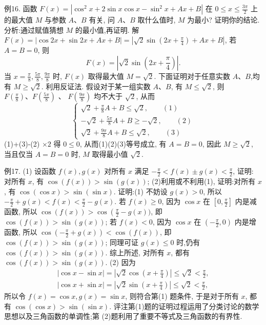例16. 函数 $F(x)=\left|\cos ^2 x+2 \sin x \cos x-\sin ^2 x+A x+B\right|$ 在 $0 \leqslant x \leqslant \frac{3 \pi}{2}$ 上的最大值 $M$ 与参数 $A 、 B$ 有关, 问 $A 、 B$ 取什么值时, $M$ 为最小? 证明你的结论.
分析:通过赋值猜想 $M$ 的最小值,再证明.
解 $F(x)=|\cos 2 x+\sin 2 x+A x+B|=\left|\sqrt{2} \sin \left(2 x+\frac{\pi}{4}\right)+A x+B\right|$, 若 $A=B=0$, 则
$$
F(x)=\left|\sqrt{2} \sin \left(2 x+\frac{\pi}{4}\right)\right| .
$$
当 $x=\frac{\pi}{8}, \frac{5 \pi}{8}, \frac{9 \pi}{8}$ 时, $F(x)$ 取得最大值 $M=\sqrt{2}$.
下面证明对于任意实数 $A 、 B$,均有 $M \geqslant \sqrt{2}$.
利用反证法.
假设对于某一组实数 $A 、 B$, 有 $M \leqslant \sqrt{2}$, 则 $F\left(\frac{\pi}{8}\right) 、 F\left(\frac{5 \pi}{8}\right)$ 、
$F\left(\frac{9 \pi}{8}\right)$ 均不大于 $\sqrt{2}$, 从而
$$
\left\{\begin{array}{l}
\sqrt{2}+\frac{\pi}{8} A+B \leqslant \sqrt{2}, \quad\quad(1)\\
-\sqrt{2}+\frac{5 \pi}{8} A+B \geqslant-\sqrt{2}, \quad\quad(2)\\
\sqrt{2}+\frac{9 \pi}{8} A+B \leqslant \sqrt{2}, \quad\quad(3)
\end{array}\right.
$$
(1)+(3)-(2) $\times 2$ 得 $0 \leqslant 0$, 从而(1)(2)(3)等号成立, 有 $A=B=0$, 因此 $M \geqslant \sqrt{2}$, 当且仅当 $A=B=0$ 时, $M$ 取得最小值 $\sqrt{2}$.



例17. (1) 设函数 $f(x), g(x)$ 对所有 $x$ 满足 $-\frac{\pi}{2}<f(x) \pm g(x)<\frac{\pi}{2}$, 证明: 对所有 $x$, 有 $\cos (f(x))>\sin (g(x))$;
 (2)利用或不利用(1), 证明:对所有 $x$, 有 $\cos (\cos x)>\sin (\sin x)$.
证明:(1) 不妨设 $g(x)>0$, 所以 $-\frac{\pi}{2}+g(x)<f(x)<\frac{\pi}{2}-g(x)$.
若 $f(x) \geqslant 0$, 因为 $\cos x$ 在 $\left[0, \frac{\pi}{2}\right]$ 内是减函数, 所以 $\cos (f(x))>\cos \left(\frac{\pi}{2}-\right. g(x))$, 即 $\cos (f(x))>\sin (g(x))$;
若 $f(x)<0$, 因为 $\cos x$ 在 $\left(-\frac{\pi}{2}, 0\right)$ 内是增函数, 所以 $\cos \left(-\frac{\pi}{2}+g(x)\right)< \cos (f(x))$, 即 $\cos (f(x))>\sin (g(x))$;
同理可证 $g(x) \leqslant 0$ 时,仍有 $\cos (f(x))>\sin (g(x))$.
综上所述, 对所有 $x$, 都有 $\cos (f(x))>\sin (g(x))$.
(2) 因为
$$
\begin{gathered}
|\cos x-\sin x|=\left|\sqrt{2} \cos \left(x+\frac{\pi}{4}\right)\right| \leqslant \sqrt{2}<\frac{\pi}{2}, \\
|\cos x+\sin x|=\left|\sqrt{2} \sin \left(x+\frac{\pi}{4}\right)\right| \leqslant \sqrt{2}<\frac{\pi}{2},
\end{gathered}
$$
所以令 $f(x)=\cos x, g(x)=\sin x$, 则符合第(1) 题条件, 于是对于所有 $x$, 都有 $\cos (\cos x)>\sin (\sin x)$.
评注第(1)题的证明过程运用了分类讨论的数学思想以及三角函数的单调性;第 (2)题利用了重要不等式及三角函数的有界性.



